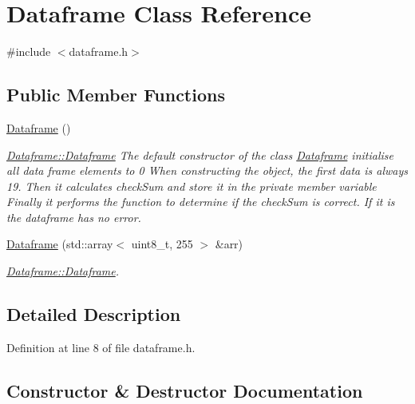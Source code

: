 \hypertarget{class_dataframe}{}\section{Dataframe Class Reference}
\label{class_dataframe}


{\ttfamily \#include $<$dataframe.\+h$>$}

\subsection*{Public Member Functions}
\begin{DoxyCompactItemize}
\item 
\hyperlink{class_dataframe_aa477a9e2ad938c736318df7263e5317c}{Dataframe} ()
\begin{DoxyCompactList}\small\item\em \hyperlink{class_dataframe_aa477a9e2ad938c736318df7263e5317c}{Dataframe\+::\+Dataframe} The default constructor of the class \hyperlink{class_dataframe}{Dataframe} initialise all data frame elements to 0 When constructing the object, the first data is always 19. Then it calculates check\+Sum and store it in the private member variable Finally it performs the function to determine if the check\+Sum is correct. If it is the dataframe has no error. \end{DoxyCompactList}\item 
\hyperlink{class_dataframe_acedbbd5b120f83e7ab2740a5f83ef003}{Dataframe} (std\+::array$<$ uint8\+\_\+t, 255 $>$ \&arr)
\begin{DoxyCompactList}\small\item\em \hyperlink{class_dataframe_aa477a9e2ad938c736318df7263e5317c}{Dataframe\+::\+Dataframe}. \end{DoxyCompactList}\end{DoxyCompactItemize}


\subsection{Detailed Description}


Definition at line 8 of file dataframe.\+h.



\subsection{Constructor \& Destructor Documentation}

